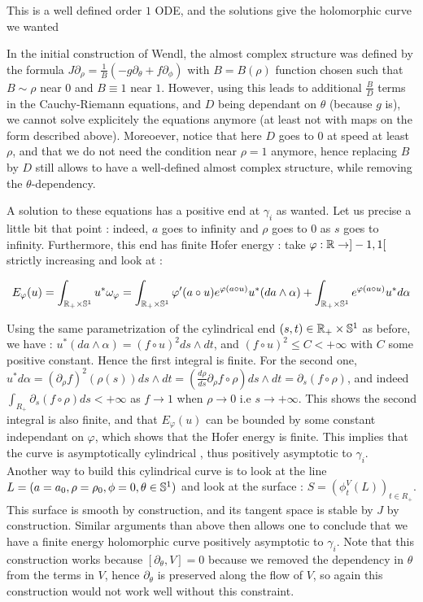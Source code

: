 \documentclass[../main.tex]{subfiles}
\begin{document}
This is a well defined order $1$ ODE, and the solutions give the holomorphic curve we wanted 
\begin{remark}
    In the initial construction of Wendl, the almost complex structure was defined by the formula $J\partial_\rho = \frac{1}{B}(-g\partial_\theta + f\partial_\phi)$ with $B = B(\rho)$ function chosen such that $B\sim \rho$ near $0$ and $B \equiv 1$ near $1$. However, using this leads to additional $\frac{B}{D}$ terms in the Cauchy-Riemann equations, and $D$ being dependant on $\theta$ (because $g$ is), we cannot solve explicitely the equations anymore (at least not with maps on the form described above). Moreoever, notice that here $D$ goes to $0$ at speed at least $\rho$, and that we do not need the condition near $\rho = 1$ anymore, hence replacing $B$ by $D$ still allows to have a well-defined almost complex structure, while removing the $\theta$-dependency.
\end{remark}

A solution to these equations has a positive end at $\gamma_i$ as wanted. Let us precise a little bit that point : indeed, $a$ goes to infinity and $\rho$ goes to $0$ as $s$ goes to infinity. Furthermore, this end has finite Hofer energy : take $\varphi : \mathbb{R}\rightarrow ]-1,1[$ strictly increasing and look at :

$$E_\varphi(u) = \int_{\mathbb{R}_+\times \mathbb{S}^1}{u^*\omega_\varphi} = \int_{\mathbb{R}_+\times \mathbb{S}^1}{\varphi'(a\circ u)e^{\varphi(a\circ u)}u^*(da\wedge \alpha)} + \int_{\mathbb{R}_+\times \mathbb{S}^1}{e^{\varphi(a\circ u)}u^*d\alpha}$$

Using the same parametrization of the cylindrical end $(s,t)\in\mathbb{R}_+\times \mathbb{S}^1$ as before, we have : $u^*(da\wedge \alpha) = (f\circ u)^2 ds \wedge dt$, and $(f\circ u)^2\leq C < +\infty$ with $C$ some positive constant. Hence the first integral is finite. For the second one, $u^*d\alpha = (\partial_\rho f)^2(\rho(s))ds\wedge dt = (\frac{d\rho}{ds}\partial_\rho f\circ \rho)ds\wedge dt = \partial_s(f\circ \rho)$, and indeed $\displaystyle\int_{R_+}\partial_s(f\circ\rho)ds < + \infty$ as $f\rightarrow 1$ when $\rho \rightarrow 0$ i.e $s\rightarrow +\infty$. This shows the second integral is also finite, and that $E_\varphi(u)$ can be bounded by some constant independant on $\varphi$, which shows that the Hofer energy is finite. This implies that the curve is asymptotically cylindrical \cite{wendl_lectures_nodate}, thus positively asymptotic to $\gamma_i$.\\

Another way to build this cylindrical curve is to look at the line $L = (a = a_0,\rho = \rho_0,\phi = 0,\theta\in \mathbb{S}^1)$ and look at the surface : $S = (\phi_t^V(L))_{t\in R_+}$. This surface is smooth by construction, and its tangent space is stable by $J$ by construction. Similar arguments than above then allows one to conclude that we have a finite energy holomorphic curve positively asymptotic to $\gamma_i$. Note that this construction works because $[\partial_\theta,V] = 0$ because we removed the dependency in $\theta$ from the terms in $V$, hence $\partial_\theta$ is preserved along the flow of $V$, so again this construction would not work well without this constraint.\\
\end{document}
